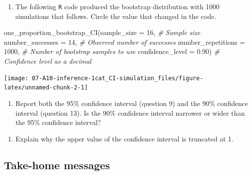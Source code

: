 \documentclass[
]{report}
\newenvironment{Shaded}{\begin{snugshade}}{\end{snugshade}}
\newcommand{\AttributeTok}[1]{\textcolor[rgb]{0.77,0.63,0.00}{#1}}
\newcommand{\CommentTok}[1]{\textcolor[rgb]{0.56,0.35,0.01}{\textit{#1}}}
\newcommand{\DecValTok}[1]{\textcolor[rgb]{0.00,0.00,0.81}{#1}}
\newcommand{\FloatTok}[1]{\textcolor[rgb]{0.00,0.00,0.81}{#1}}
\newcommand{\FunctionTok}[1]{\textcolor[rgb]{0.00,0.00,0.00}{#1}}
\newcommand{\NormalTok}[1]{#1}
\providecommand{\tightlist}{%
  \setlength{\itemsep}{0pt}\setlength{\parskip}{0pt}}
\begin{document}
\vspace{0.4in}

\begin{enumerate}
\def\labelenumi{\arabic{enumi}.}
\setcounter{enumi}{12}
\tightlist
\item
  The following \texttt{R} code produced the bootstrap distribution with 1000 simulations that follows. Circle the value that changed in the code.
\end{enumerate}

\begin{Shaded}
\begin{Highlighting}[]
\FunctionTok{one\_proportion\_bootstrap\_CI}\NormalTok{(}\AttributeTok{sample\_size =} \DecValTok{16}\NormalTok{, }\CommentTok{\# Sample size}
                    \AttributeTok{number\_successes =} \DecValTok{14}\NormalTok{, }\CommentTok{\# Observed number of successes}
                    \AttributeTok{number\_repetitions =} \DecValTok{1000}\NormalTok{, }\CommentTok{\# Number of bootstrap samples to use}
                    \AttributeTok{confidence\_level =} \FloatTok{0.90}\NormalTok{) }\CommentTok{\# Confidence level as a decimal}
\end{Highlighting}
\end{Shaded}

\begin{center}\texttt{[image: 07-A10-inference-1cat\_CI-simulation\_files/figure-latex/unnamed-chunk-2-1]} \end{center}

\begin{enumerate}
\def\labelenumi{\arabic{enumi}.}
\setcounter{enumi}{13}
\tightlist
\item
  Report both the 95\% confidence interval (question 9) and the 90\% confidence interval (question 13). Is the 90\% confidence interval narrower or wider than the 95\% confidence interval?
\end{enumerate}

\vspace{0.5in}

\begin{enumerate}
\def\labelenumi{\arabic{enumi}.}
\setcounter{enumi}{14}
\tightlist
\item
  Explain why the upper value of the confidence interval is truncated at 1.
\end{enumerate}

\vspace{0.5in}

\hypertarget{take-home-messages-10}{%
\subsection{Take-home messages}\label{take-home-messages-10}}
\end{document}
